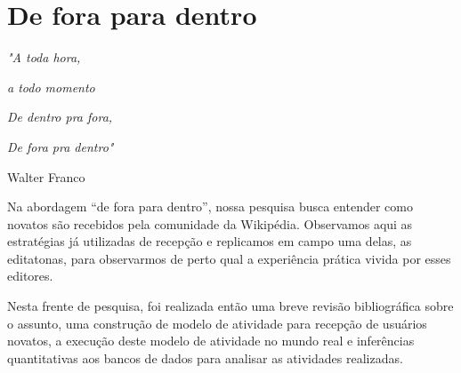 \chapter{De fora para dentro}

\singlespacing
\begin{flushright}
\textit{"A toda hora,}

\textit{a todo momento}

\textit{De dentro pra fora,}

\textit{De fora pra dentro"}

Walter Franco
\end{flushright}
\doublespacing

Na abordagem ``de fora para dentro'', nossa pesquisa busca entender como novatos são recebidos pela comunidade da Wikipédia. Observamos aqui as estratégias já utilizadas de recepção e replicamos em campo uma delas, as editatonas, para observarmos de perto qual a experiência prática vivida por esses editores.

Nesta frente de pesquisa, foi realizada então uma breve revisão bibliográfica sobre o assunto, uma construção de modelo de atividade para recepção de usuários novatos, a execução deste modelo de atividade no mundo real e inferências quantitativas aos bancos de dados para analisar as atividades realizadas.





